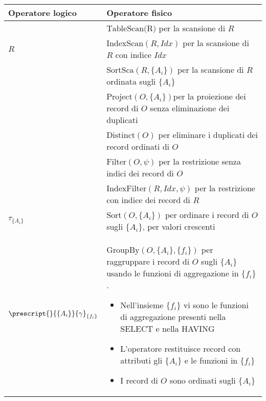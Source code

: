 \bgroup
\def\arraystretch{1.5}
\begin{table}[!h]
	\centering
	\begin{tabular}{|M{100pt}|M{300pt}|}
		\hline
		\textbf{Operatore logico} & \textbf{Operatore fisico} \\
		\hline
		& $\text{TableScan(R)}$ \linebreak per la scansione di $R$ \\ 
		$R$& $\text{IndexScan}(R, Idx)$ \linebreak per la scansione di $R$ con indice $Idx$ \\ 
		& $\text{SortSca}(R, \{A_i\})$ \linebreak per la scansione di $R$ ordinata sugli $\{A_i\}$\\ 
		\hline
		 & $\text{Project}(O, \{A_i\})$\linebreak per la proiezione dei record di $O$ senza eliminazione dei duplicati \\ 
		& $\text{Distinct}(O)$ \linebreak per eliminare i duplicati dei record ordinati di $O$ \\
		\hline
		 & $\text{Filter}(O, \psi)$ \linebreak per la restrizione senza indici dei record di $O$ \\ 
		& $\text{IndexFilter}(R, Idx, \psi)$ \linebreak per la restrizione con indice dei record di $R$ \\
		\hline
		$\tau_{\{A_i\}}$ & $\text{Sort}(O,\{A_i\})$ \linebreak per ordinare i record di $O$ sugli $\{A_i\}$, per valori crescenti \\
		\hline
		$\prescript{}{\{A_i\}}{\gamma}_{\{f_i\}}$ & $\text{GroupBy}(O, \{A_i\}, \{f_i\})$ \linebreak per raggruppare i record di $O$ sugli $\{A_i\}$ usando le funzioni di aggregazione in $\{f_i\}$.
		\begin{itemize}
			\item Nell'insieme $\{f_i\}$ vi sono le funzioni di aggregazione presenti nella SELECT e nella HAVING
			\item L'operatore restituisce record con attributi gli $\{A_i\}$ e le funzioni in $\{f_i\}$
			\item I record di $O$ sono ordinati sugli $\{A_i\}$
		\end{itemize} \\

\end{tabular}
\end{table}
